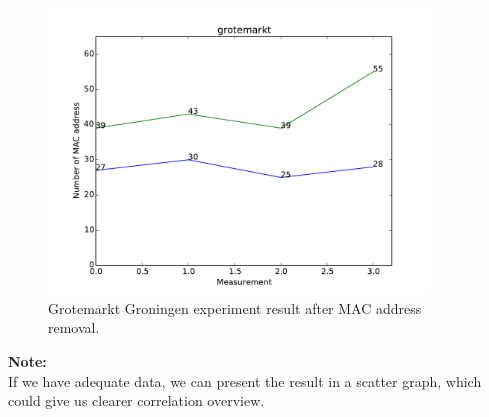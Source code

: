 \documentclass{article}
\begin{document}
\begin{figure}[H]
	\centering
	\includegraphics[width=0.9\textwidth]{./grotemarkt.pdf}
	\caption{Grotemarkt Groningen experiment result after MAC address removal. }
	\label{fig:grotemarkt-after}
\end{figure}


\noindent
\textbf{Note:}\\
If we have adequate data, we can present the result in a scatter graph, which could give us clearer correlation overview.

{}

\end{document}
